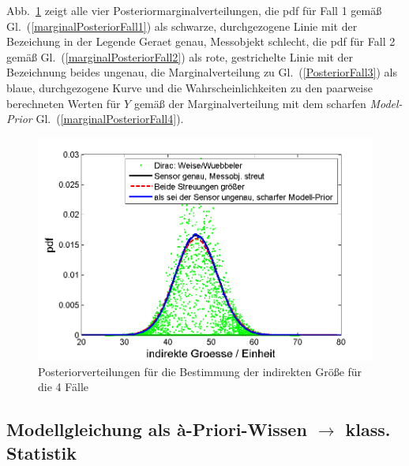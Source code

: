 Abb.~\ref{fig:Posteriorverteilungen_4Faelle} zeigt alle vier Posteriormarginalverteilungen,
die pdf für Fall 1 gemäß Gl.~(\ref{marginalPosteriorFall1}) als schwarze, durchgezogene Linie mit
der Bezeichung in der Legende \glqq Geraet genau, Messobjekt schlecht\grqq, die pdf für
Fall 2 gemäß Gl.~(\ref{marginalPosteriorFall2}) als rote, gestrichelte Linie mit der
Bezeichnung \glqq beides ungenau\grqq, die Marginalverteilung
zu Gl.~(\ref{PosteriorFall3}) als blaue, durchgezogene Kurve und die
Wahrscheinlichkeiten zu den paarweise berechneten Werten für $Y$ gemäß der Marginalverteilung
mit dem scharfen \textsl{Model-Prior} Gl.~(\ref{marginalPosteriorFall4}).
\begin{figure}[!htb]
	\begin{center}
		\includegraphics[width=130mm]{11_vorlesung_GUMS1/media/Posterior_all.png}
		\caption{Posteriorverteilungen für die Bestimmung der
			indirekten Größe für die 4 Fälle}
		\label{fig:Posteriorverteilungen_4Faelle}
	\end{center}
\end{figure}

\newpage

\subsection{Modellgleichung als {\`a}-Priori-Wissen $\rightarrow$  klass. Statistik}

